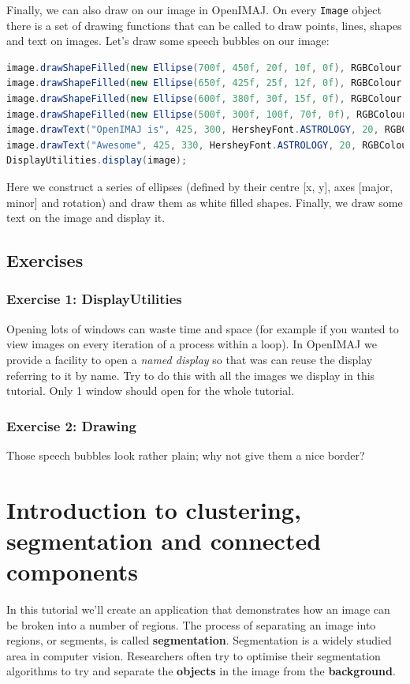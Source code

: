 \documentclass[10pt,a4paper,twoside,extrafontsizes]{memoir}
\begin{document}
Finally, we can also draw on our image in OpenIMAJ. On every \verb+Image+ object there is a 
set of drawing functions that can be called to draw points, lines, shapes and text on 
images. Let's draw some speech bubbles on our image:
\begin{lstlisting}[language=java]
image.drawShapeFilled(new Ellipse(700f, 450f, 20f, 10f, 0f), RGBColour.WHITE);
image.drawShapeFilled(new Ellipse(650f, 425f, 25f, 12f, 0f), RGBColour.WHITE);
image.drawShapeFilled(new Ellipse(600f, 380f, 30f, 15f, 0f), RGBColour.WHITE);
image.drawShapeFilled(new Ellipse(500f, 300f, 100f, 70f, 0f), RGBColour.WHITE);
image.drawText("OpenIMAJ is", 425, 300, HersheyFont.ASTROLOGY, 20, RGBColour.BLACK);
image.drawText("Awesome", 425, 330, HersheyFont.ASTROLOGY, 20, RGBColour.BLACK);
DisplayUtilities.display(image);
\end{lstlisting}
Here we construct a series of ellipses (defined by their centre [x, y], axes 
[major, minor] and rotation) and draw them as white filled shapes. Finally, we draw 
some text on the image and display it.

\section*{Exercises}
\subsection*{Exercise 1: DisplayUtilities}
Opening lots of windows can waste time and space (for example if you wanted to view images on every 
iteration of a process within a loop). In OpenIMAJ we provide a facility to open a 
\emph{named display} so that was can reuse the display referring to it by name. Try to do this with all the 
images we display in this tutorial. Only 1 window should open for the whole tutorial.
\subsection*{Exercise 2: Drawing}
Those speech bubbles look rather plain; why not give them a nice border?

\chapter{Introduction to clustering, segmentation and connected components}
In this tutorial we'll create an application that demonstrates how an image can be 
broken into a number of regions. The process of separating an image into regions, 
or segments, is called \textbf{segmentation}. Segmentation is a widely studied area in 
computer vision. Researchers often try to optimise their segmentation algorithms 
to try and separate the \textbf{objects} in the image from the \textbf{background}.
\end{document}
